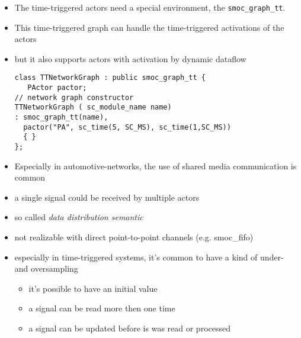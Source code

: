 \begin{frame}[fragile=singleslide]
\begin{itemize}
\item The time-triggered actors need a special environment, the \lstinline{smoc_graph_tt}.
\item This time-triggered graph can handle the time-triggered activations of the actors
\item but it also supports actors with activation by dynamic dataflow
\begin{lstlisting}
class TTNetworkGraph : public smoc_graph_tt {
   PActor pactor;
// network graph constructor
TTNetworkGraph ( sc_module_name name)
: smoc_graph_tt(name),
  pactor("PA", sc_time(5, SC_MS), sc_time(1,SC_MS))
  { }
};
\end{lstlisting}
\end{itemize}
\end{frame}




\begin{frame}[fragile=singleslide]
\begin{itemize}
\item Especially in automotive-networks, the use of shared media communication is common
\item a single signal could be received by multiple actors
\item so called \textit{data distribution semantic}
\item not realizable with direct point-to-point channels (e.g. smoc\_fifo)
\item especially in time-triggered systems, it's common to have a kind of under- and oversampling
\begin{itemize}
\item it's possible to have an initial value
\item a signal can be read more then one time
\item a signal can be updated before is was read or processed
\end{itemize}
\end{itemize}
\end{frame}




